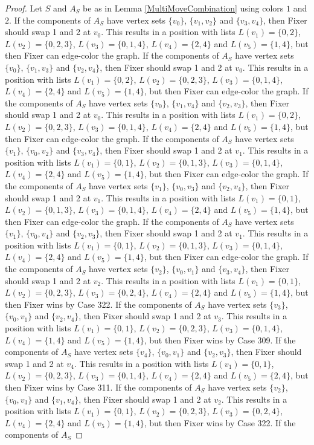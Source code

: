 \documentclass[12pt]{amsart}
\theoremstyle{plain}
\theoremstyle{definition}
\theoremstyle{remark}
\begin{document}
\begin{proof}
Let $S$ and $A_S$ be as in Lemma \ref{MultiMoveCombination} using colors $1$ and $2$. If the components of $A_S$ have vertex sets $\{v_0\}$, $\{v_1, v_2\}$ and $\{v_3, v_4\}$, then Fixer should swap 1 and 2 at $v_0$. This results in a position with lists $L(v_1) = \{0, 2\}$, $L(v_2) = \{0, 2, 3\}$, $L(v_3) = \{0, 1, 4\}$, $L(v_4) = \{2, 4\}$ and $L(v_5) = \{1, 4\}$, but then Fixer can edge-color the graph. If the components of $A_S$ have vertex sets $\{v_0\}$, $\{v_1, v_3\}$ and $\{v_2, v_4\}$, then Fixer should swap 1 and 2 at $v_0$. This results in a position with lists $L(v_1) = \{0, 2\}$, $L(v_2) = \{0, 2, 3\}$, $L(v_3) = \{0, 1, 4\}$, $L(v_4) = \{2, 4\}$ and $L(v_5) = \{1, 4\}$, but then Fixer can edge-color the graph. If the components of $A_S$ have vertex sets $\{v_0\}$, $\{v_1, v_4\}$ and $\{v_2, v_3\}$, then Fixer should swap 1 and 2 at $v_0$. This results in a position with lists $L(v_1) = \{0, 2\}$, $L(v_2) = \{0, 2, 3\}$, $L(v_3) = \{0, 1, 4\}$, $L(v_4) = \{2, 4\}$ and $L(v_5) = \{1, 4\}$, but then Fixer can edge-color the graph. If the components of $A_S$ have vertex sets $\{v_1\}$, $\{v_0, v_2\}$ and $\{v_3, v_4\}$, then Fixer should swap 1 and 2 at $v_1$. This results in a position with lists $L(v_1) = \{0, 1\}$, $L(v_2) = \{0, 1, 3\}$, $L(v_3) = \{0, 1, 4\}$, $L(v_4) = \{2, 4\}$ and $L(v_5) = \{1, 4\}$, but then Fixer can edge-color the graph. If the components of $A_S$ have vertex sets $\{v_1\}$, $\{v_0, v_3\}$ and $\{v_2, v_4\}$, then Fixer should swap 1 and 2 at $v_1$. This results in a position with lists $L(v_1) = \{0, 1\}$, $L(v_2) = \{0, 1, 3\}$, $L(v_3) = \{0, 1, 4\}$, $L(v_4) = \{2, 4\}$ and $L(v_5) = \{1, 4\}$, but then Fixer can edge-color the graph. If the components of $A_S$ have vertex sets $\{v_1\}$, $\{v_0, v_4\}$ and $\{v_2, v_3\}$, then Fixer should swap 1 and 2 at $v_1$. This results in a position with lists $L(v_1) = \{0, 1\}$, $L(v_2) = \{0, 1, 3\}$, $L(v_3) = \{0, 1, 4\}$, $L(v_4) = \{2, 4\}$ and $L(v_5) = \{1, 4\}$, but then Fixer can edge-color the graph. If the components of $A_S$ have vertex sets $\{v_2\}$, $\{v_0, v_1\}$ and $\{v_3, v_4\}$, then Fixer should swap 1 and 2 at $v_2$. This results in a position with lists $L(v_1) = \{0, 1\}$, $L(v_2) = \{0, 2, 3\}$, $L(v_3) = \{0, 2, 4\}$, $L(v_4) = \{2, 4\}$ and $L(v_5) = \{1, 4\}$, but then Fixer wins by Case 322. If the components of $A_S$ have vertex sets $\{v_3\}$, $\{v_0, v_1\}$ and $\{v_2, v_4\}$, then Fixer should swap 1 and 2 at $v_3$. This results in a position with lists $L(v_1) = \{0, 1\}$, $L(v_2) = \{0, 2, 3\}$, $L(v_3) = \{0, 1, 4\}$, $L(v_4) = \{1, 4\}$ and $L(v_5) = \{1, 4\}$, but then Fixer wins by Case 309. If the components of $A_S$ have vertex sets $\{v_4\}$, $\{v_0, v_1\}$ and $\{v_2, v_3\}$, then Fixer should swap 1 and 2 at $v_4$. This results in a position with lists $L(v_1) = \{0, 1\}$, $L(v_2) = \{0, 2, 3\}$, $L(v_3) = \{0, 1, 4\}$, $L(v_4) = \{2, 4\}$ and $L(v_5) = \{2, 4\}$, but then Fixer wins by Case 311. If the components of $A_S$ have vertex sets $\{v_2\}$, $\{v_0, v_3\}$ and $\{v_1, v_4\}$, then Fixer should swap 1 and 2 at $v_2$. This results in a position with lists $L(v_1) = \{0, 1\}$, $L(v_2) = \{0, 2, 3\}$, $L(v_3) = \{0, 2, 4\}$, $L(v_4) = \{2, 4\}$ and $L(v_5) = \{1, 4\}$, but then Fixer wins by Case 322. If the components of $A_S$ 
\end{proof}
\end{document}
